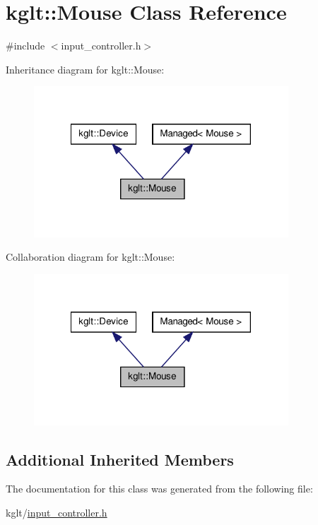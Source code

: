 \hypertarget{classkglt_1_1_mouse}{\section{kglt\-:\-:Mouse Class Reference}
\label{classkglt_1_1_mouse}
}


{\ttfamily \#include $<$input\-\_\-controller.\-h$>$}



Inheritance diagram for kglt\-:\-:Mouse\-:\nopagebreak
\begin{figure}[H]
\begin{center}
\leavevmode
\includegraphics[width=270pt]{classkglt_1_1_mouse__inherit__graph}
\end{center}
\end{figure}


Collaboration diagram for kglt\-:\-:Mouse\-:\nopagebreak
\begin{figure}[H]
\begin{center}
\leavevmode
\includegraphics[width=270pt]{classkglt_1_1_mouse__coll__graph}
\end{center}
\end{figure}
\subsection*{Additional Inherited Members}


The documentation for this class was generated from the following file\-:\begin{DoxyCompactItemize}
\item 
kglt/\hyperlink{input__controller_8h}{input\-\_\-controller.\-h}\end{DoxyCompactItemize}
